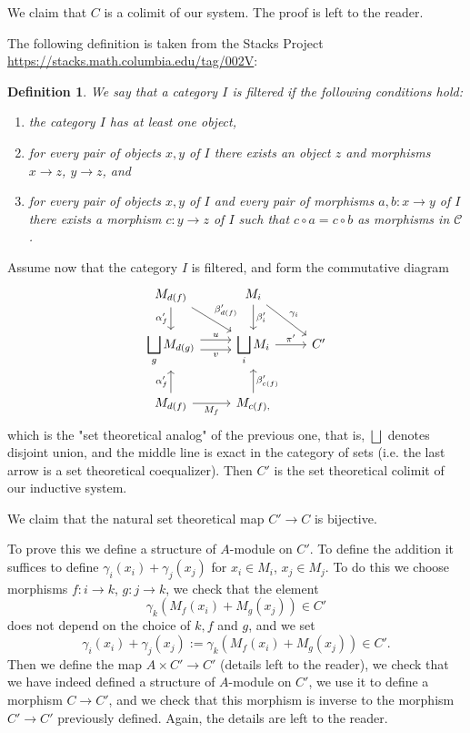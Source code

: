 \documentclass[parskip=half,fontsize=12pt]{scrartcl}%
\newcommand{\ds}{\displaystyle}
\newtheorem{df}[thm]{Definition}
\begin{document}
We claim that $C$ is a colimit of our system. The proof is left to the reader.

The following definition is taken from the Stacks Project \\ \href{https://stacks.math.columbia.edu/tag/002V}{https://stacks.math.columbia.edu/tag/002V}:

\begin{df}
We say that a category $I$ is \emph{filtered} if the following conditions hold:
\begin{enumerate}
\item the category $I$ has at least one object,
\item for every pair of objects $x, y$ of $I$ there exists an object $z$ and morphisms $x \to z$, $y \to z$, and
\item for every pair of objects $x, y$ of $I$ and every pair of morphisms $a, b : x \to y$ of $I$ there exists a morphism $c : y \to z$ of $I$ such that $c \circ a=c\circ b$ as morphisms in $\mathcal{C}$.
\end{enumerate}
\end{df}

Assume now that the category $I$ is filtered, and form the commutative diagram %
$$
\begin{tikzcd}
M_{d(f)}\ar[d,"\alpha'_{f}"']\ar[dr,"\beta'_{d(f)}"]&M_i\ar[d,"\beta'_i"]\ar[dr,"\gamma_i"]\\ 
\ds\bigsqcup_gM_{d(g)}\ar[r,yshift=0.9ex,"u"]\ar[r,yshift=-0.9ex,"v"']&\ds\bigsqcup_iM_i\ar[r,"\pi'"]&C'\\ 
M_{d(f)}\ar[u,"\alpha'_{f}"]\ar[r,"M_f"']&M_{c(f),}\ar[u,"\beta'_{c(f)}"']
\end{tikzcd}
$$ 
which is the "set theoretical analog" of the previous one, that is, $\bigsqcup$ denotes disjoint union, and the middle line is exact in the category of sets (i.e. the last arrow is a set theoretical coequalizer). Then $C'$ is the set theoretical colimit of our inductive system. 

We claim that the natural set theoretical map $C'\to C$ is bijective. 

To prove this we define a structure of $A$-module on $C'$. To define the addition it suffices to define $\gamma_i(x_i)+\gamma_j(x_j)$ for $x_i\in M_i$, $x_j\in M_j$. To do this we choose morphisms $f:i\to k$, $g:j\to k$, we check that the element 
$$
\gamma_k(M_f(x_i)+M_g(x_j))\in C'
$$ 
does not depend on the choice of $k,f$ and $g$, and we set 
$$
\gamma_i(x_i)+\gamma_j(x_j):=\gamma_k(M_f(x_i)+M_g(x_j))\in C'.
$$ 
Then we define the map $A\times C'\to C'$ (details left to the reader), we check that we have indeed defined a structure of $A$-module on $C'$, we use it to define a morphism $C\to C'$, and we check that this morphism is inverse to the morphism $C'\to C'$ previously defined. Again, the details are left to the reader. 
\end{document}
